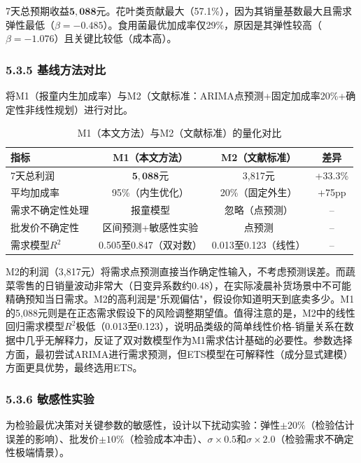 \documentclass[12pt,a4paper]{article}
\begin{document}
7天总预期收益$\mathbf{5,088}$元。花叶类贡献最大（57.1\%），因为其销量基数最大且需求弹性最低（$\beta=-0.485$）。食用菌最优加成率仅29\%，原因是其弹性较高（$\beta=-1.076$）且关键比较低（成本高）。

\subsubsection{5.3.5 基线方法对比}

将M1（报童内生加成率）与M2（文献标准：ARIMA点预测+固定加成率20\%+确定性非线性规划）进行对比。

\begin{table}[H]
\centering
\caption{M1（本文方法）与M2（文献标准）的量化对比}
\begin{tabular}{lccc}
\toprule
指标 & M1（本文方法） & M2（文献标准） & 差异 \\
\midrule
7天总利润 & $\mathbf{5,088}$元 & 3,817元 & +33.3\% \\
平均加成率 & 95\%（内生优化） & 20\%（固定外生） & +75pp \\
需求不确定性处理 & 报童模型 & 忽略（点预测） & -- \\
批发价不确定性 & 区间预测+敏感性实验 & 点预测 & -- \\
需求模型$R^2$ & 0.505至0.847（双对数） & 0.013至0.123（线性） & -- \\
\bottomrule
\end{tabular}
\end{table}

M2的利润（3,817元）将需求点预测直接当作确定性输入，不考虑预测误差。而蔬菜零售的日销量波动非常大（日变异系数约0.48），在实际凌晨补货场景中不可能精确预知当日需求。M2的高利润是"乐观偏估"，假设你知道明天到底卖多少。M1的5,088元则是在正态需求假设下的风险调整期望值。值得注意的是，M2中的线性回归需求模型$R^2$极低（0.013至0.123），说明品类级的简单线性价格-销量关系在数据中几乎无解释力，反证了双对数模型作为M1需求估计基础的必要性。参数选择方面，最初尝试ARIMA进行需求预测，但ETS模型在可解释性（成分显式建模）方面更具优势，最终选用ETS。

\subsubsection{5.3.6 敏感性实验}

为检验最优决策对关键参数的敏感性，设计以下扰动实验：弹性$\pm 20\%$（检验估计误差的影响）、批发价$\pm 10\%$（检验成本冲击）、$\sigma \times 0.5$和$\sigma \times 2.0$（检验需求不确定性极端情景）。
\end{document}

